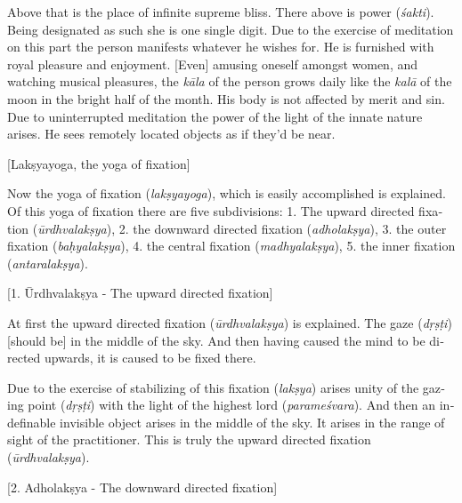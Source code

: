 \begin{otherlanguage}{english}
\begin{tlate}
     \end{tlate}
  \begin{tlate}
Above that is the place of infinite supreme bliss. There above is power (\textit{śakti}). Being designated as such she is one single digit. Due to the exercise of meditation on this part the person manifests whatever he wishes for. He is furnished with royal pleasure and enjoyment. [Even] amusing oneself amongst women, and watching musical pleasures, the \textit{kāla} of the person grows daily like the \textit{kalā} of the moon in the bright half of the month. His body is not affected by merit and sin. Due to uninterrupted meditation the power of the light of the innate nature arises. He sees remotely located objects as if they'd be near.
\end{tlate}
     \bigskip
    \centerline{\textrm{\small{[Lakṣyayoga, the yoga of fixation]}}}
    \bigskip
 \begin{tlate}
   Now the yoga of fixation (\textit{lakṣyayoga}), which is easily accomplished is explained. Of this yoga of fixation there are five subdivisions:
   1. The upward directed fixation (\textit{ūrdhvalakṣya}),
   2. the downward directed fixation (\textit{adholakṣya}),
   3. the outer fixation (\textit{baḥyalakṣya}),
   4. the central fixation (\textit{madhyalakṣya}),
   5. the inner fixation (\textit{antaralakṣya}).
 \end{tlate}
     \bigskip
    \centerline{\textrm{\small{[1. Ūrdhvalakṣya - The upward directed fixation]}}}
    \bigskip    
  \begin{tlate}
At first the upward directed fixation (\textit{ūrdhvalakṣya}) is explained. The gaze (\textit{dṛṣṭi}) [should be] in the middle of the sky. And then having caused the mind to be directed upwards, it is caused to be fixed there. 
    \end{tlate}
  \begin{tlate}
Due to the exercise of stabilizing of this fixation (\textit{lakṣya}) arises unity of the gazing point (\textit{dṛṣṭi}) with the light of the highest lord (\textit{parameśvara}). And then an indefinable invisible object arises in the middle of the sky. It arises in the range of sight of the practitioner. This is truly the upward directed fixation (\textit{ūrdhvalakṣya}).
  \end{tlate}
   \bigskip
    \centerline{\textrm{\small{[2. Adholakṣya - The downward directed fixation]}}}

\end{otherlanguage}
